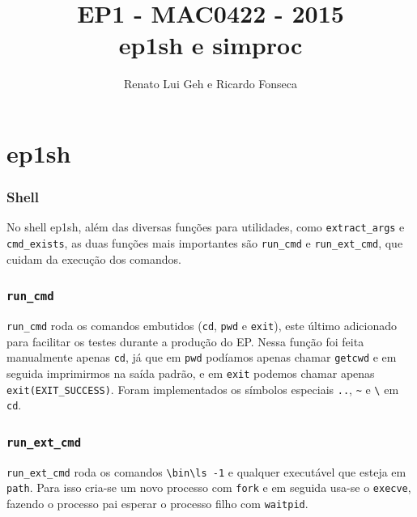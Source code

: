 \documentclass{beamer}
\title[EP1 - MAC0422]{EP1 - MAC0422 - 2015 \\
                      ep1sh e simproc} %
\author{Renato Lui Geh e Ricardo Fonseca}
\date{}
\begin{document}
\begin{frame}
  \titlepage %
\end{frame}



\section{ep1sh} %

\begin{frame}
  \frametitle{Shell}
  No shell ep1sh, além das diversas funções para utilidades, como \texttt{extract\_args} e \texttt{cmd\_exists}, as duas funções mais importantes são \texttt{run\_cmd} e \texttt{run\_ext\_cmd}, que cuidam
  da execução dos comandos.
\end{frame}

\begin{frame}
  \frametitle{\texttt{run\_cmd}}
  \texttt{run\_cmd} roda os comandos embutidos (\texttt{cd}, \texttt{pwd} e \texttt{exit}), este último adicionado para facilitar os testes durante a produção do EP. Nessa função foi feita manualmente apenas \texttt{cd}, já que em \texttt{pwd} podíamos apenas chamar
  \texttt{getcwd} e em seguida imprimirmos na saída padrão, e em \texttt{exit} podemos chamar apenas \texttt{exit(EXIT\_SUCCESS)}. Foram implementados os símbolos especiais \texttt{..}, \texttt{\~} e \texttt{\textbackslash} em
  \texttt{cd}.
\end{frame}

\begin{frame}
  \frametitle{\texttt{run\_ext\_cmd}}
  \texttt{run\_ext\_cmd} roda os comandos \texttt{\textbackslash bin\textbackslash ls -1} e qualquer executável que esteja em \texttt{path}. Para isso cria-se um novo processo com \texttt{fork} e em seguida usa-se o \texttt{execve},
  fazendo o processo pai esperar o processo filho com \texttt{waitpid}.
\end{frame}

\end{document}
